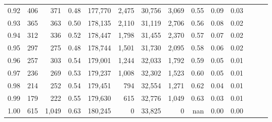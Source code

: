 \begin{tabular}{rrrrrrrrrrrrrr}
0.92 &    406 &    371 &  0.48 &  177,770 &    2,475 &  30,756 &   3,069 &  0.55 &  0.09 &      0.03 \\
0.93 &    365 &    363 &  0.50 &  178,135 &    2,110 &  31,119 &   2,706 &  0.56 &  0.08 &      0.02 \\
0.94 &    312 &    336 &  0.52 &  178,447 &    1,798 &  31,455 &   2,370 &  0.57 &  0.07 &      0.02 \\
0.95 &    297 &    275 &  0.48 &  178,744 &    1,501 &  31,730 &   2,095 &  0.58 &  0.06 &      0.02 \\
0.96 &    257 &    303 &  0.54 &  179,001 &    1,244 &  32,033 &   1,792 &  0.59 &  0.05 &      0.01 \\
0.97 &    236 &    269 &  0.53 &  179,237 &    1,008 &  32,302 &   1,523 &  0.60 &  0.05 &      0.01 \\
0.98 &    214 &    252 &  0.54 &  179,451 &      794 &  32,554 &   1,271 &  0.62 &  0.04 &      0.01 \\
0.99 &    179 &    222 &  0.55 &  179,630 &      615 &  32,776 &   1,049 &  0.63 &  0.03 &      0.01 \\
1.00 &    615 &  1,049 &  0.63 &  180,245 &        0 &  33,825 &       0 &   nan &  0.00 &      0.00 \\
\bottomrule
\end{tabular}
